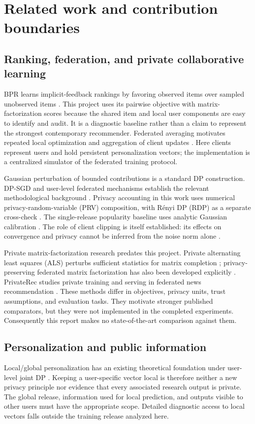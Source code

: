 \section{Related work and contribution boundaries}
\label{sec:related}
\subsection{Ranking, federation, and private collaborative learning}
BPR learns implicit-feedback rankings by favoring observed items over sampled
unobserved items \citep{rendle2009bpr}. This project uses its pairwise objective
with matrix-factorization scores because the shared item and local user
components are easy to identify and audit. It is a diagnostic baseline rather
than a claim to represent the strongest contemporary recommender. Federated
averaging motivates repeated local optimization and aggregation of client
updates \citep{mcmahan2017fedavg}. Here clients represent users and hold persistent
personalization vectors; the implementation is a centralized simulator of the
federated training protocol.

Gaussian perturbation of bounded contributions is a standard DP construction.
DP-SGD and user-level federated mechanisms establish the relevant methodological
background \citep{abadi2016dp,mcmahan2017userdp}. Privacy accounting in this work
uses numerical privacy-random-variable (PRV) composition, with R\'enyi DP (RDP)
as a separate cross-check \citep{gopi2021composition,mironov2017rdp,mironov2019sampled}.
The single-release popularity baseline uses analytic Gaussian calibration
\citep{balle2018gaussian}. The role of client clipping is itself established:
its effects on convergence and privacy cannot be inferred from the noise norm
alone \citep{zhang2022clipping}.

Private matrix-factorization research predates this project. Private alternating
least squares (ALS) perturbs sufficient statistics for matrix completion
\citep{chien2021privateals}; privacy-preserving federated matrix factorization
has also been developed explicitly \citep{li2022federatedmf}. PrivateRec studies
private training and serving in federated news recommendation
\citep{liu2023privaterec}. These methods differ in objectives, privacy units,
trust assumptions, and evaluation tasks. They motivate stronger published
comparators, but they were not implemented in the completed experiments.
Consequently this report makes no state-of-the-art comparison against them.

\subsection{Personalization and public information}
Local/global personalization has an existing theoretical foundation under
user-level joint DP \citep{bietti2022personalization}. Keeping a user-specific
vector local is therefore neither a new privacy principle nor evidence that
every associated research output is private. The global release, information
used for local prediction, and outputs visible to other users must have the
appropriate scope. Detailed diagnostic access to local vectors falls outside
the training release analyzed here.

